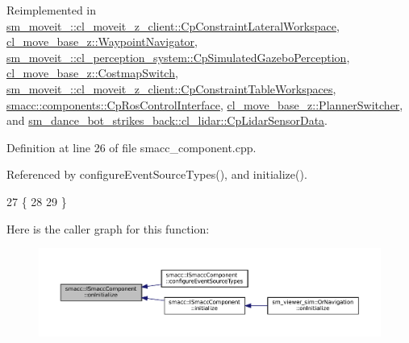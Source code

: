 Reimplemented in \hyperlink{classsm__moveit__4_1_1cl__moveit__z__client_1_1CpConstraintLateralWorkspace_af50ccf402ab65fe3702188e5bdbcfdad}{sm\+\_\+moveit\+\_\+::cl\+\_\+moveit\+\_\+z\+\_\+client\+::\+Cp\+Constraint\+Lateral\+Workspace}, \hyperlink{classcl__move__base__z_1_1WaypointNavigator_a75f7b66878f380dd81516fbd7cb3640d}{cl\+\_\+move\+\_\+base\+\_\+z\+::\+Waypoint\+Navigator}, \hyperlink{classsm__moveit__4_1_1cl__perception__system_1_1CpSimulatedGazeboPerception_adebc30f6b1fc905f783de3f7bdf4a711}{sm\+\_\+moveit\+\_\+::cl\+\_\+perception\+\_\+system\+::\+Cp\+Simulated\+Gazebo\+Perception}, \hyperlink{classcl__move__base__z_1_1CostmapSwitch_ad4d125cd563ed0bb76d27226bc47e63e}{cl\+\_\+move\+\_\+base\+\_\+z\+::\+Costmap\+Switch}, \hyperlink{classsm__moveit__4_1_1cl__moveit__z__client_1_1CpConstraintTableWorkspaces_a86292aeca8f4672617b6ea617dfb4a73}{sm\+\_\+moveit\+\_\+::cl\+\_\+moveit\+\_\+z\+\_\+client\+::\+Cp\+Constraint\+Table\+Workspaces}, \hyperlink{classsmacc_1_1components_1_1CpRosControlInterface_a469bdb5723a9ab66d6b0a7908d5891bf}{smacc\+::components\+::\+Cp\+Ros\+Control\+Interface}, \hyperlink{classcl__move__base__z_1_1PlannerSwitcher_a36bc2b9788f03a1ca02b954c625ef4c5}{cl\+\_\+move\+\_\+base\+\_\+z\+::\+Planner\+Switcher}, and \hyperlink{classsm__dance__bot__strikes__back_1_1cl__lidar_1_1CpLidarSensorData_a138dad9a855d5d4962410374d0a29d30}{sm\+\_\+dance\+\_\+bot\+\_\+strikes\+\_\+back\+::cl\+\_\+lidar\+::\+Cp\+Lidar\+Sensor\+Data}.



Definition at line 26 of file smacc\+\_\+component.\+cpp.



Referenced by configure\+Event\+Source\+Types(), and initialize().


\begin{DoxyCode}
27 \{
28 
29 \}
\end{DoxyCode}
Here is the caller graph for this function\+:
\nopagebreak
\begin{figure}[H]
\begin{center}
\leavevmode
\includegraphics[width=350pt]{classsmacc_1_1ISmaccComponent_ae6f71d008db12553912e9436184b9e65_icgraph}
\end{center}
\end{figure}
\mbox{\label{classsmacc_1_1ISmaccComponent_a687dead5b87a3b9781b9bf6ab0b7afa5}} 
